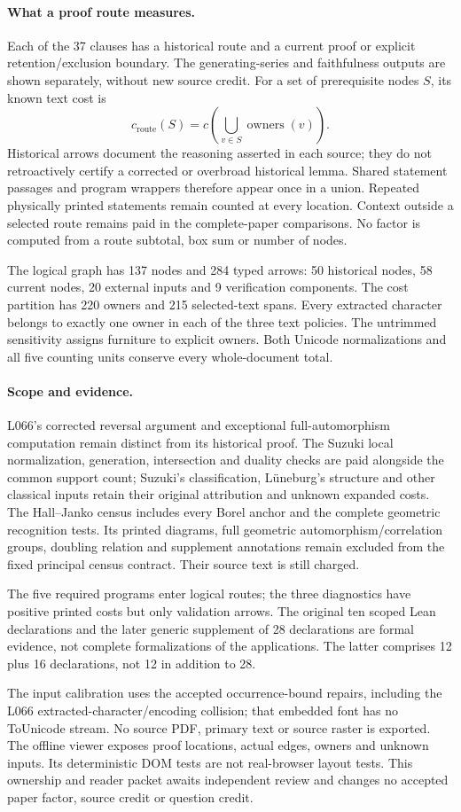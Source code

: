 \documentclass[a4paper,11pt]{article}
\begin{document}
\paragraph{What a proof route measures.}
Each of the 37 clauses has a historical route and a current proof or explicit
retention/exclusion boundary. The generating-series and faithfulness outputs are
shown separately, without new source credit. For a set of prerequisite nodes
$S$, its known text cost is
\[c_{\mathrm{route}}(S)=c\!\left(\bigcup_{v\in S}\operatorname{owners}(v)\right).\]
Historical arrows document the reasoning asserted in each source; they do not
retroactively certify a corrected or overbroad historical lemma.
Shared statement passages and program wrappers therefore appear once in a union.
Repeated physically printed statements remain counted at every location.
Context outside a selected route remains paid in the complete-paper comparisons.
No factor is computed from a route subtotal, box sum or number of nodes.

The logical graph has 137 nodes and 284 typed arrows: 50 historical nodes,
58 current nodes, 20 external inputs and 9 verification components. The cost
partition has 220 owners and 215 selected-text spans. Every extracted character
belongs to exactly one owner in each of the three text policies. The untrimmed
sensitivity assigns furniture to explicit owners. Both Unicode normalizations
and all five counting units conserve every whole-document total.

\paragraph{Scope and evidence.}
L066's corrected reversal argument and exceptional full-automorphism computation
remain distinct from its historical proof. The Suzuki local normalization,
generation, intersection and duality checks are paid alongside the common
support count; Suzuki's classification, Lüneburg's structure and other classical
inputs retain their original attribution and unknown expanded costs.
The Hall--Janko census includes every Borel anchor and the complete geometric
recognition tests. Its printed diagrams, full geometric automorphism/correlation
groups, doubling relation and supplement annotations remain excluded from the
fixed principal census contract. Their source text is still charged.

The five required programs enter logical routes; the three diagnostics have
positive printed costs but only validation arrows. The original ten scoped Lean
declarations and the later generic supplement of 28 declarations are formal
evidence, not complete formalizations of the applications. The latter comprises
12 plus 16 declarations, not 12 in addition to 28.

The input calibration uses the accepted occurrence-bound repairs, including the
L066 extracted-character/encoding collision; that embedded font has no
ToUnicode stream. No source PDF, primary text or source raster is exported.
The offline viewer exposes proof locations, actual edges, owners and unknown
inputs. Its deterministic DOM tests are not real-browser layout tests. This
ownership and reader packet awaits independent review and changes no accepted
paper factor, source credit or question credit.
\end{document}
